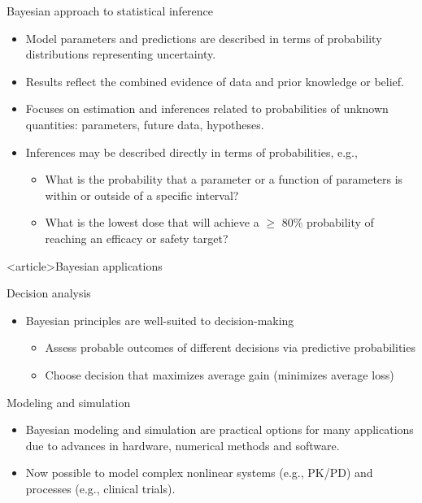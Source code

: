 \documentclass{beamer}
\begin{document}
\begin{frame}{Bayesian approach to statistical inference}

\begin{itemize}
\item Model parameters and predictions are described in terms of probability distributions representing uncertainty.
\item Results reflect the combined evidence of data and prior knowledge or belief.
\item Focuses on estimation and inferences related to probabilities of unknown quantities: parameters, future data, hypotheses.
\item Inferences may be described directly in terms of probabilities, e.g.,
\begin{itemize}
  \item What is the probability that a parameter or a function of parameters is
  within or outside of a specific interval?
  \item What is the lowest dose that will achieve a $\ge$ 80\% probability
    of reaching an efficacy or safety target?
\end{itemize}
\end{itemize}

\end{frame}


\begin{frame}<article>{Bayesian applications}

\begin{block}{Decision analysis}
\begin{itemize}
\item Bayesian principles are well-suited to decision-making
\begin{itemize}
\item  Assess probable outcomes of different decisions via predictive probabilities
\item Choose decision that maximizes average gain (minimizes average loss) 
\end{itemize}
\end{itemize}
\end{block}

\begin{block}{Modeling and simulation}
\begin{itemize}
\item  Bayesian modeling and simulation are practical options for many applications due to advances in hardware, numerical methods and software.
\item Now possible to model complex nonlinear systems (e.g., PK/PD) and processes (e.g., clinical trials).
\end{itemize}
\end{block}

\end{frame}
\end{document}
